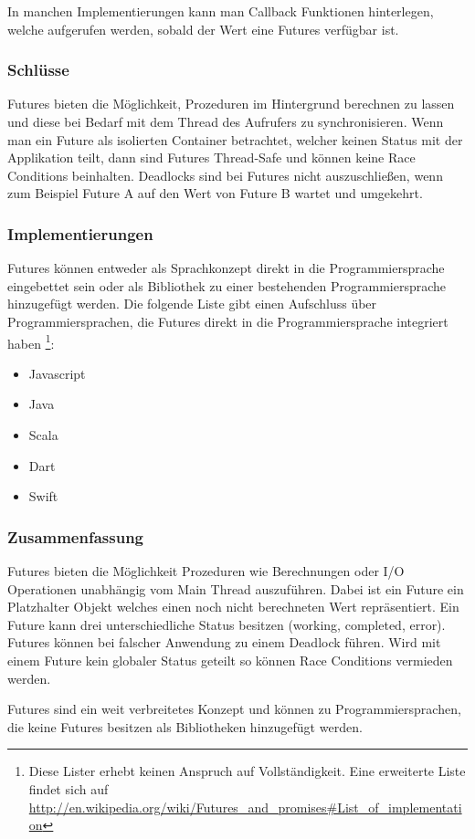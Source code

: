 In manchen Implementierungen kann man Callback Funktionen hinterlegen, welche aufgerufen werden, sobald der Wert eine Futures verfügbar ist. 

\subsubsection{Schlüsse}
Futures bieten die Möglichkeit, Prozeduren im Hintergrund berechnen zu lassen und diese bei Bedarf mit dem Thread des Aufrufers zu synchronisieren. Wenn man ein Future als isolierten Container betrachtet, welcher keinen Status mit der Applikation teilt, dann sind Futures Thread-Safe und können keine Race Conditions beinhalten. Deadlocks sind bei Futures nicht auszuschließen, wenn zum Beispiel Future A auf den Wert von Future B wartet und umgekehrt.

\subsubsection{Implementierungen}
Futures können entweder als Sprachkonzept direkt in die Programmiersprache eingebettet sein oder als Bibliothek zu einer bestehenden Programmiersprache hinzugefügt werden. Die folgende Liste gibt einen Aufschluss über Programmiersprachen, die Futures direkt in die Programmiersprache integriert haben \footnote{Diese Lister erhebt keinen Anspruch auf Vollständigkeit. Eine erweiterte Liste findet sich auf \url{http://en.wikipedia.org/wiki/Futures_and_promises#List_of_implementation}}:

\begin{itemize}
  \item Javascript
  \item Java
  \item Scala
  \item Dart
  \item Swift
\end{itemize}  

\subsubsection{Zusammenfassung}
Futures bieten die Möglichkeit Prozeduren wie Berechnungen oder I/O Operationen unabhängig vom Main Thread auszuführen. Dabei ist ein Future ein Platzhalter Objekt welches einen noch nicht berechneten Wert repräsentiert. Ein Future kann drei unterschiedliche Status besitzen (working, completed, error). Futures können bei falscher Anwendung zu einem Deadlock führen. Wird mit einem Future kein globaler Status geteilt so können Race Conditions vermieden werden. 

Futures sind ein weit verbreitetes Konzept und können zu Programmiersprachen, die keine Futures besitzen als Bibliotheken hinzugefügt werden.